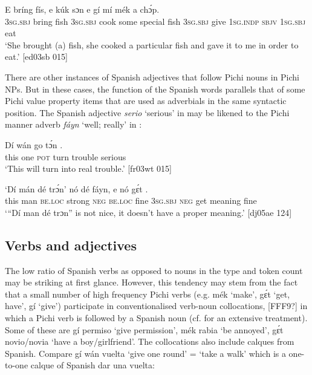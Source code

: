 \ea%
    \label{ex:key:1705}
    \gll E    bríng  fís,  e    kúk    sɔn      \textstylePichiexamplebold{\textmd{,}}
e    gí  mí    mék    a    chɔ́p.\\
\textsc{3sg.sbj}  bring  fish  \textsc{3sg.sbj}  cook  some  special  fish
\textsc{3sg.sbj}  give  \textsc{1sg.indp}  \textsc{sbjv}    \textsc{1sg.sbj}  eat\\

\glt ‘She brought (a) fish, she cooked a particular fish and gave it to me 
in order to eat.’ [ed03sb 015]
\z

There are other instances of Spanish adjectives that follow Pichi nouns in Pichi NPs. But in these cases, the function of the Spanish words parallels that of some Pichi value property items that are used as adverbials in the same syntactic position. The Spanish adjective \textit{serio} ‘serious’ in  may be likened to the Pichi manner adverb \textit{fáyn} ‘well; really’ in :


\ea%
    \label{ex:key:1706}
    \gll Dí  wán    go  tɔ́n      .\\
this  one    \textsc{pot}  turn    trouble  serious\\

\glt ‘This will turn into real trouble.’ [fr03wt 015]
\z


\ea%
    \label{ex:key:1707}
    \gll ‘Dí    mán    dé    trɔ́n’  nó  dé    fáyn,  e    nó  gɛ́t
    . \\
 this  man    \textsc{be.loc}  strong  \textsc{neg}  \textsc{be.loc}  fine    \textsc{3sg.sbj}  \textsc{neg}  get
meaning    fine\\

\glt ‘“Dí man dé trɔn” is not nice, it doesn’t have a proper meaning.’ [dj05ae 124]
\z

\subsection{Verbs and adjectives}\label{sec:13.2.2}

The low ratio of Spanish verbs as opposed to nouns in the type and token count may be striking at first glance. However, this tendency may stem from the fact that a small number of high frequency Pichi verbs (e.g. mék ‘make’, gɛ́t ‘get, have’, gí ‘give’) participate in conventionalised verb-noun collocations, [FFF9?] in which a Pichi verb is followed by a Spanish noun (cf.  for an extensive treatment). Some of these are gí permiso ‘give permission’, mék rabia ‘be annoyed’, gɛ́t novio/novia ‘have a boy/girlfriend’. The collocations also include calques from Spanish. Compare gí wán vuelta ‘give one round’ = ‘take a walk’ which is a one-to-one calque of Spanish dar una vuelta:


